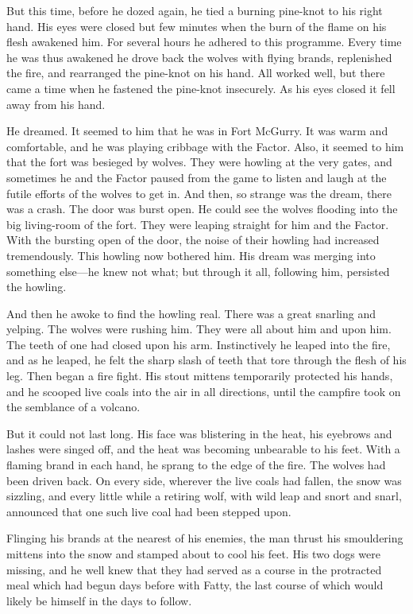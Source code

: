 \documentclass[10pt]{book}
\begin{document}
But this time, before he dozed again, he tied a burning pine-knot to
his right hand. His eyes were closed but few minutes when the burn of
the flame on his flesh awakened him. For several hours he adhered to
this programme. Every time he was thus awakened he drove back the
wolves with flying brands, replenished the fire, and rearranged the
pine-knot on his hand. All worked well, but there came a time when he
fastened the pine-knot insecurely. As his eyes closed it fell away from
his hand.

He dreamed. It seemed to him that he was in Fort McGurry. It was warm
and comfortable, and he was playing cribbage with the Factor. Also, it
seemed to him that the fort was besieged by wolves. They were howling
at the very gates, and sometimes he and the Factor paused from the game
to listen and laugh at the futile efforts of the wolves to get in. And
then, so strange was the dream, there was a crash. The door was burst
open. He could see the wolves flooding into the big living-room of the
fort. They were leaping straight for him and the Factor. With the
bursting open of the door, the noise of their howling had increased
tremendously. This howling now bothered him. His dream was merging into
something else—he knew not what; but through it all, following him,
persisted the howling.

And then he awoke to find the howling real. There was a great snarling
and yelping. The wolves were rushing him. They were all about him and
upon him. The teeth of one had closed upon his arm. Instinctively he
leaped into the fire, and as he leaped, he felt the sharp slash of
teeth that tore through the flesh of his leg. Then began a fire fight.
His stout mittens temporarily protected his hands, and he scooped live
coals into the air in all directions, until the campfire took on the
semblance of a volcano.

But it could not last long. His face was blistering in the heat, his
eyebrows and lashes were singed off, and the heat was becoming
unbearable to his feet. With a flaming brand in each hand, he sprang to
the edge of the fire. The wolves had been driven back. On every side,
wherever the live coals had fallen, the snow was sizzling, and every
little while a retiring wolf, with wild leap and snort and snarl,
announced that one such live coal had been stepped upon.

Flinging his brands at the nearest of his enemies, the man thrust his
smouldering mittens into the snow and stamped about to cool his feet.
His two dogs were missing, and he well knew that they had served as a
course in the protracted meal which had begun days before with Fatty,
the last course of which would likely be himself in the days to follow.
\end{document}
